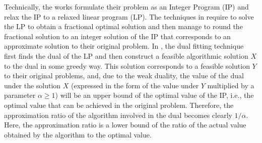 \documentclass[10pt,journal,compsoc]{IEEEtran}
\begin{document}
Technically, the works \cite{Jain11a,Jain,Lucier,Bodik,Azar} formulate their problem as an Integer Program (IP) and relax the IP to a relaxed linear program (LP). The techniques in \cite{Jain11a,Bodik} require to solve the LP to obtain a fractional optimal solution and then manage to round the fractional solution to an integer solution of the IP that corresponds to an approximate solution to their original problem. In \cite{Jain,Lucier,Azar}, the dual fitting technique first finds the dual of the LP and then construct a feasible algorithmic solution $X$ to the dual in some greedy way. This solution corresponds to a feasible solution $Y$ to their original problems, and, due to the weak duality, the value of the dual under the solution $X$ (expressed in the form of the value under $Y$ multiplied by a parameter $\alpha\geq 1$) will be an upper bound of the optimal value of the IP, i.e., the optimal value that can be achieved in the original problem. Therefore, the approximation ratio of the algorithm involved in the dual becomes clearly  $1/\alpha$. Here, the approximation ratio is a lower bound of the ratio of the actual value obtained by the algorithm to the optimal value.
\end{document}
